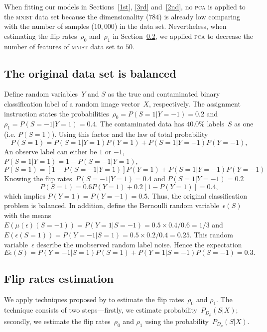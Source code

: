 \documentclass[12pt]{article} %
\begin{document}
When fitting our models in Sections~\ref{1st}, \ref{3rd} and~\ref{2nd}, no \textsc{pca} is applied to the \textsc{mnist} data set because the dimensionality ($784$) is already low comparing with the number of samples ($10,000$) in the data set. Nevertheless, when estimating the flip rates~$\rho_0$ and~$\rho_1$ in Section~\ref{method2}, we applied \textsc{pca} to decrease the number of features of \textsc{mnist} data set to $50$.

\subsection{The original data set is balanced} \label{sec:1}
Define random variables~$Y$ and $S$ as the true and contaminated binary classification label of a random image vector~$X$, respectively. The assignment instruction states the probabilities~$\rho_0=P(S=1|Y=-1)=0.2$ and $\rho_1=P(S=-1|Y=1)=0.4$.
The contaminated data has $40.0\%$ labels~$S$ as one (i.e. $P(S=1)$). Using this factor and the law of total probability
\begin{equation*}
P(S=1)=P(S=1|Y=1)P(Y=1)+P(S=1|Y=-1)P(Y=-1),
\end{equation*}
An observe label can either be $1$ or $-1$, $P(S=1|Y=1)=1-P(S=-1|Y=1)$,
\begin{equation*}
P(S=1)=\left[1-P(S=-1|Y=1)\right]P(Y=1)+P(S=1|Y=-1)P(Y=-1)
\end{equation*}
Knowing the flip rates~$P(S=-1|Y=1)=0.4$ and $P(S=1|Y=-1)=0.2$
\begin{equation}
P(S=1)=0.6P(Y=1)+0.2\left[1-P(Y=1)\right]=0.4, \label{eq:ps}
\end{equation}
which implies $P(Y=1)=P(Y=-1)=0.5$. Thus, the original classification problem is balanced. 
In addition, define the Bernoulli random variable~$\epsilon(S)$ with the means $E(\mu(\epsilon)(S=-1))=P(Y=1|S=-1)=0.5\times0.4/0.6=1/3$ and $E(\epsilon(S=1))=P(Y=-1|S=1)=0.5\times0.2/0.4=0.25$. This random variable~$\epsilon$ describe the unobserved random label noise. Hence the expectation
\begin{equation}
    E\epsilon(S)=P(Y=-1|S=1)P(S=1)+P(Y=1|S=-1)P(S=-1)
    =0.3.\label{eq:exp}
\end{equation}

\subsection{Flip rates estimation}\label{method2}
We apply techniques proposed by \citet{liu2016classification} to estimate the flip rates~$\rho_0$ and $\rho_1$. The technique consists of two steps---firstly, we estimate probability~$P_{D_\rho}(S|X)$; secondly, we estimate the flip rates~$\rho_0$ and $\rho_1$ using the probability~$P_{D_\rho}(S|X)$. 
\end{document}
